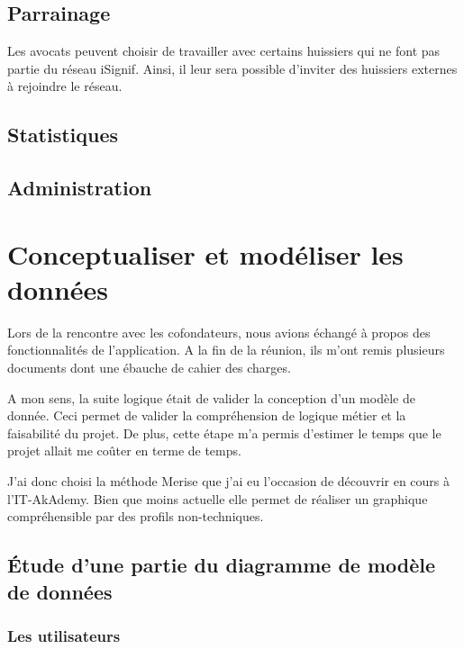 \documentclass[]{report}
\begin{document}
    \subsection{Parrainage}

      Les avocats peuvent choisir de travailler avec certains huissiers qui ne font pas partie du réseau iSignif. Ainsi, il leur sera possible d'inviter des huissiers externes à rejoindre le réseau.

    \subsection{Statistiques}


    \subsection{Administration}


  \section{Conceptualiser et modéliser les données}

    Lors de la rencontre avec les cofondateurs, nous avions échangé à propos des fonctionnalités de l'application. A la fin de la réunion, ils m'ont remis plusieurs documents dont une ébauche de cahier des charges.

    A mon sens, la suite logique était de valider la conception d'un modèle de donnée. Ceci permet de valider la compréhension de logique métier et la faisabilité du projet. De plus, cette étape m'a permis d'estimer le temps que le projet allait me coûter en terme de temps.

    J'ai donc choisi la méthode Merise que j'ai eu l'occasion de découvrir en cours à l'IT-AkAdemy. Bien que moins actuelle elle permet de réaliser un graphique compréhensible par des profils non-techniques.

    \subsection{Étude d'une partie du diagramme de modèle de données}

      \subsubsection{Les utilisateurs}
\end{document}
